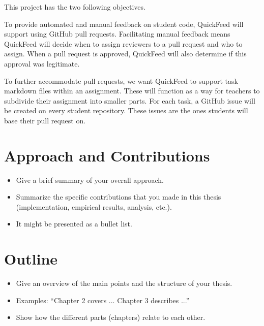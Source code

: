 This project has the two following objectives.

To provide automated and manual feedback on student code, QuickFeed will support using GitHub pull requests.
Facilitating manual feedback means QuickFeed will decide when to assign reviewers to a pull request and who to assign.
When a pull request is approved, QuickFeed will also determine if this approval was legitimate.

To further accommodate pull requests, we want QuickFeed to support task markdown files within an assignment.
These will function as a way for teachers to subdivide their assignment into smaller parts.
For each task, a GitHub issue will be created on every student repository.
These issues are the ones students will base their pull request on.

\section{Approach and Contributions}

\begin{itemize}
\item Give a brief summary of your overall approach.
\item Summarize the specific contributions that you made in this thesis (implementation, empirical results, analysis, etc.).
\item It might be presented as a bullet list.
\end{itemize}


\section{Outline}

\begin{itemize}
\item Give an overview of the main points and the structure of your thesis.
\item Examples: ``Chapter 2 covers ...  Chapter 3 describes ...''
\item Show how the different parts (chapters) relate to each other.
\end{itemize}
